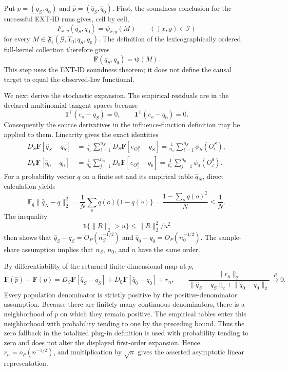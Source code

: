 Put \(p=(q_S,q_0)\) and \(\widehat p=(\widehat q_S,\widehat q_0)\).  First, the soundness conclusion for the successful EXT-ID runs gives, cell by cell,
\[
F_{x,y}(q_S,q_0)=\psi_{x,y}(M)
\qquad ((x,y)\in\mathcal I)
\]
for every \(M\in\mathfrak F_{\epsilon}(\mathcal G,T_0;q_S,q_0)\).  The definition of the lexicographically ordered full-kernel collection therefore gives
\[
\mathbf F(q_S,q_0)=\boldsymbol\psi(M).
\]
This step uses the EXT-ID soundness theorem; it does not define the causal target to equal the observed-law functional.

We next derive the stochastic expansion.  The empirical residuals are in the declared multinomial tangent spaces because
\[
\mathbf 1^{\mathsf T}(e_o-q_S)=0,
\qquad
\mathbf 1^{\mathsf T}(e_o-q_0)=0.
\]
Consequently the source derivatives in the influence-function definition may be applied to them.  Linearity gives the exact identities
\[
\begin{aligned}
D_S\mathbf F[\widehat q_S-q_S]
&=\frac1{n_S}\sum_{i=1}^{n_S}
D_S\mathbf F[e_{O_i^S}-q_S]
=\frac1{n_S}\sum_{i=1}^{n_S}\phi_S(O_i^S),\\
D_0\mathbf F[\widehat q_0-q_0]
&=\frac1{n_0}\sum_{j=1}^{n_0}
D_0\mathbf F[e_{O_j^0}-q_0]
=\frac1{n_0}\sum_{j=1}^{n_0}\phi_0(O_j^0).
\end{aligned}
\]
For a probability vector \(q\) on a finite set and its empirical table \(\widehat q_N\), direct calculation yields
\[
\mathbb E_q\|\widehat q_N-q\|_2^2
=\frac1N\sum_o q(o)\{1-q(o)\}
=\frac{1-\sum_o q(o)^2}{N}\le \frac1N.
\]
The inequality
\[
\mathbf 1\{\|R\|_2>u\}\le \|R\|_2^2/u^2
\]
then shows that \(\widehat q_S-q_S=O_P(n_S^{-1/2})\) and \(\widehat q_0-q_0=O_P(n_0^{-1/2})\).  The sample-share assumption implies that \(n_S\), \(n_0\), and \(n\) have the same order.

By differentiability of the returned finite-dimensional map at \(p\),
\[
\mathbf F(\widehat p)-\mathbf F(p)
=D_S\mathbf F[\widehat q_S-q_S]
+D_0\mathbf F[\widehat q_0-q_0]+r_n,
\qquad
\frac{\|r_n\|_2}{\|\widehat q_S-q_S\|_2+\|\widehat q_0-q_0\|_2}
\xrightarrow{P}0.
\]
Every population denominator is strictly positive by the positive-denominator assumption.  Because there are finitely many continuous denominators, there is a neighborhood of \(p\) on which they remain positive.  The empirical tables enter this neighborhood with probability tending to one by the preceding bound.  Thus the zero fallback in the totalized plug-in definition is used with probability tending to zero and does not alter the displayed first-order expansion.  Hence \(r_n=o_P(n^{-1/2})\), and multiplication by \(\sqrt n\) gives the asserted asymptotic linear representation.

